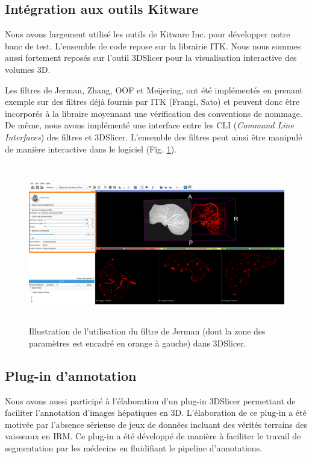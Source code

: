 \subsection{Intégration aux outils Kitware}

Nous avons largement utilisé les outils de Kitware Inc. pour développer notre banc de test. L'ensemble de code repose sur la librairie ITK. Nous nous sommes aussi fortement reposés sur l'outil 3DSlicer pour la visualisation interactive des volumes 3D.

Les filtres de Jerman, Zhang, OOF et Meijering, ont été implémentés en prenant exemple sur des filtres déjà fournis par ITK (Frangi, Sato) et peuvent donc être incorporés à la libraire moyennant une vérification des conventions de nommage. De même, nous avons implémenté une interface entre les CLI (\textit{Command Line Interfaces}) des filtres et 3DSlicer. L'ensemble des filtres peut ainsi être manipulé de manière interactive dans le logiciel (Fig. \ref{fig:slicer_vesselness}).

\begin{figure}[H]
    \includegraphics[height=7cm]{Images/slicer_jerman.png}
    \caption{Illustration de l'utilisation du filtre de Jerman (dont la zone des  paramètres est encadré en orange à gauche) dans 3DSlicer.}
    \label{fig:slicer_vesselness}
\end{figure}

\subsection{Plug-in d'annotation}

Nous avons aussi participé à l'élaboration d'un plug-in 3DSlicer permettant de faciliter l'annotation d'images hépatiques en 3D. L'élaboration de ce plug-in a été motivée par l'absence sérieuse de jeux de données incluant des vérités terrains des vaisseaux en IRM. Ce plug-in a été développé de manière à faciliter le travail de segmentation par les médecins en fluidifiant le pipeline d'annotations.

